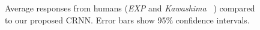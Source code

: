 \begin{figure}[ht!]
    \centering
    \begin{adjustbox}{width=0.7\columnwidth}
      
    \end{adjustbox}
    \caption{Average responses from humans (\emph{EXP} and \emph{Kawashima}
~\cite{kawashima15}) compared to our proposed CRNN. Error bars show 95\% confidence intervals.}%
    \label{fig:experiment}
 \end{figure}
